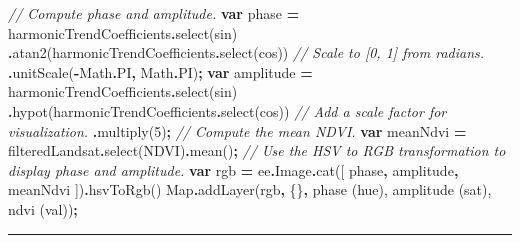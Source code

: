 \documentclass[
]{article}
\newenvironment{Shaded}{\begin{snugshade}}{\end{snugshade}}
\newcommand{\AttributeTok}[1]{\textcolor[rgb]{0.77,0.63,0.00}{#1}}
\newcommand{\BuiltInTok}[1]{#1}
\newcommand{\CommentTok}[1]{\textcolor[rgb]{0.56,0.35,0.01}{\textit{#1}}}
\newcommand{\ConstantTok}[1]{\textcolor[rgb]{0.00,0.00,0.00}{#1}}
\newcommand{\DecValTok}[1]{\textcolor[rgb]{0.00,0.00,0.81}{#1}}
\newcommand{\FunctionTok}[1]{\textcolor[rgb]{0.00,0.00,0.00}{#1}}
\newcommand{\KeywordTok}[1]{\textcolor[rgb]{0.13,0.29,0.53}{\textbf{#1}}}
\newcommand{\NormalTok}[1]{#1}
\newcommand{\OperatorTok}[1]{\textcolor[rgb]{0.81,0.36,0.00}{\textbf{#1}}}
\newcommand{\StringTok}[1]{\textcolor[rgb]{0.31,0.60,0.02}{#1}}
\begin{document}
\begin{Shaded}
\begin{Highlighting}[]
\CommentTok{// Compute phase and amplitude.}
\KeywordTok{var}\NormalTok{ phase }\OperatorTok{=}\NormalTok{ harmonicTrendCoefficients}\OperatorTok{.}\FunctionTok{select}\NormalTok{(}\StringTok{\textquotesingle{}sin\textquotesingle{}}\NormalTok{)}
        \OperatorTok{.}\FunctionTok{atan2}\NormalTok{(harmonicTrendCoefficients}\OperatorTok{.}\FunctionTok{select}\NormalTok{(}\StringTok{\textquotesingle{}cos\textquotesingle{}}\NormalTok{))  }
        \CommentTok{// Scale to [0, 1] from radians.  }
  \OperatorTok{.}\FunctionTok{unitScale}\NormalTok{(}\OperatorTok{{-}}\BuiltInTok{Math}\OperatorTok{.}\ConstantTok{PI}\OperatorTok{,} \BuiltInTok{Math}\OperatorTok{.}\ConstantTok{PI}\NormalTok{)}\OperatorTok{;}
\KeywordTok{var}\NormalTok{ amplitude }\OperatorTok{=}\NormalTok{ harmonicTrendCoefficients}\OperatorTok{.}\FunctionTok{select}\NormalTok{(}\StringTok{\textquotesingle{}sin\textquotesingle{}}\NormalTok{)}
        \OperatorTok{.}\FunctionTok{hypot}\NormalTok{(harmonicTrendCoefficients}\OperatorTok{.}\FunctionTok{select}\NormalTok{(}\StringTok{\textquotesingle{}cos\textquotesingle{}}\NormalTok{))  }
        \CommentTok{// Add a scale factor for visualization.  }
  \OperatorTok{.}\FunctionTok{multiply}\NormalTok{(}\DecValTok{5}\NormalTok{)}\OperatorTok{;}
\CommentTok{// Compute the mean NDVI.}
\KeywordTok{var}\NormalTok{ meanNdvi }\OperatorTok{=}\NormalTok{ filteredLandsat}\OperatorTok{.}\FunctionTok{select}\NormalTok{(}\StringTok{\textquotesingle{}NDVI\textquotesingle{}}\NormalTok{)}\OperatorTok{.}\FunctionTok{mean}\NormalTok{()}\OperatorTok{;}
\CommentTok{// Use the HSV to RGB transformation to display phase and amplitude.}
\KeywordTok{var}\NormalTok{ rgb }\OperatorTok{=}\NormalTok{ ee}\OperatorTok{.}\AttributeTok{Image}\OperatorTok{.}\FunctionTok{cat}\NormalTok{([}
\NormalTok{                        phase}\OperatorTok{,}
\NormalTok{                        amplitude}\OperatorTok{,} 
\NormalTok{                        meanNdvi}
\NormalTok{        ])}\OperatorTok{.}\FunctionTok{hsvToRgb}\NormalTok{()}
\BuiltInTok{Map}\OperatorTok{.}\FunctionTok{addLayer}\NormalTok{(rgb}\OperatorTok{,}\NormalTok{ \{\}}\OperatorTok{,} \StringTok{\textquotesingle{}phase (hue), amplitude (sat), ndvi (val)\textquotesingle{}}\NormalTok{)}\OperatorTok{;}
\end{Highlighting}
\end{Shaded}

\begin{center}\rule{0.5\linewidth}{0.5pt}\end{center}
\end{document}
